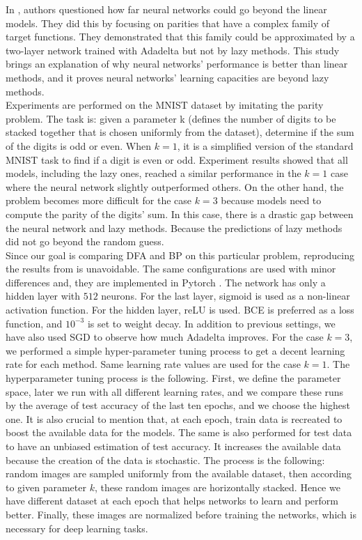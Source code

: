 \documentclass[a4paper, nobind]{templates/ociamthesis}
\begin{document}
In \cite{DBLP:journals/corr/abs-2002-07400}, authors questioned how far neural networks could go beyond the linear models. They did this by focusing on parities that have a complex family of target functions. They demonstrated that this family could be approximated by a two-layer network trained with Adadelta but not by lazy methods. This study brings an explanation of why neural networks' performance is better than linear methods, and it proves neural networks' learning capacities are beyond lazy methods.\\
Experiments are performed on the MNIST dataset by imitating the parity problem. The task is: given a parameter k (defines the number of digits to be stacked together that is chosen uniformly from the dataset), determine if the sum of the digits is odd or even. When \(k=1\), it is a simplified version of the standard MNIST task to find if a digit is even or odd. Experiment results showed that all models, including the lazy ones, reached a similar performance in the \(k=1\) case where the neural network slightly outperformed others. On the other hand, the problem becomes more difficult for the case \(k=3\) because models need to compute the parity of the digits' sum. In this case, there is a drastic gap between the neural network and lazy methods. Because the predictions of lazy methods did not go beyond the random guess.\\
Since our goal is comparing DFA and BP on this particular problem, reproducing the results from \cite{DBLP:journals/corr/abs-2002-07400} is unavoidable. The same configurations are used with minor differences and, they are implemented in Pytorch \cite{NEURIPS2019_9015}. The network has only a hidden layer with \(512\) neurons. For the last layer, sigmoid is used as a non-linear activation function. For the hidden layer, reLU is used. BCE is preferred as a loss function, and \(10^{-3}\) is set to weight decay. In addition to previous settings, we have also used SGD to observe how much Adadelta improves. For the case \(k=3\), we performed a simple hyper-parameter tuning process to get a decent learning rate for each method. Same learning rate values are used for the case \(k=1\). The hyperparameter tuning process is the following. First, we define the parameter space, later we run with all different learning rates, and we compare these runs by the average of test accuracy of the last ten epochs, and we choose the highest one. It is also crucial to mention that, at each epoch, train data is recreated to boost the available data for the models. The same is also performed for test data to have an unbiased estimation of test accuracy. It increases the available data because the creation of the data is stochastic. The process is the following: random images are sampled uniformly from the available dataset, then according to given parameter \(k\), these random images are horizontally stacked. Hence we have different dataset at each epoch that helps networks to learn and perform better. Finally, these images are normalized before training the networks, which is necessary for deep learning tasks.
\end{document}
